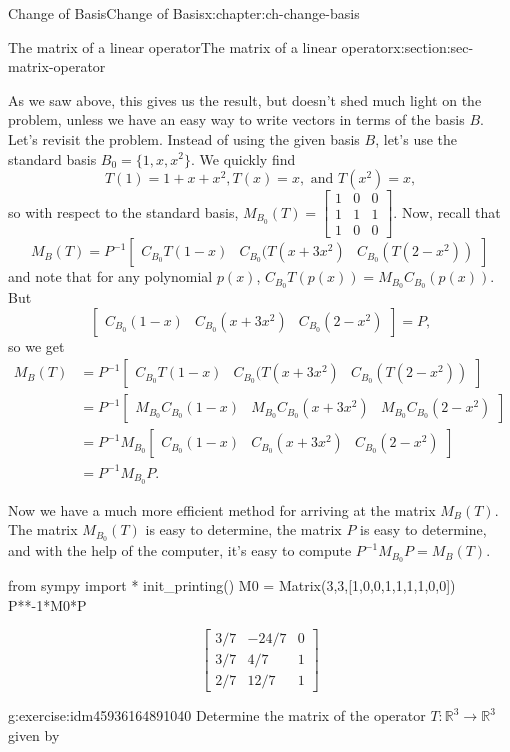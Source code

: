 \documentclass[oneside,10pt,]{book}
\numberwithin{equation}{section}
\newcommand{\bbm}{\begin{bmatrix}}
\newcommand{\ebm}{\end{bmatrix}}
\newcommand{\R}{\mathbb{R}}
\newcommand{\amp}{&}
\begin{document}
\begin{chapterptx}{Change of Basis}{}{Change of Basis}{}{}{x:chapter:ch-change-basis}
\begin{sectionptx}{The matrix of a linear operator}{}{The matrix of a linear operator}{}{}{x:section:sec-matrix-operator}
%
\par
As we saw above, this gives us the result, but doesn't shed much light on the problem, unless we have an easy way to write vectors in terms of the basis \(B\). Let's revisit the problem. Instead of using the given basis \(B\), let's use the standard basis \(B_0 = \{1,x,x^2\}\). We quickly find%
\begin{equation*}
T(1)=1+x+x^2, T(x) = x, \text{ and } T(x^2)=x\text{,}
\end{equation*}
so with respect to the standard basis, \(M_{B_0}(T) = \bbm 1\amp 0\amp 0\\1\amp 1\amp 1\\1\amp 0\amp 0\ebm\). Now, recall that%
\begin{equation*}
M_{B}(T)=P^{-1}\bbm C_{B_0}T(1-x)\amp C_{B_0}(T(x+3x^2)\amp C_{B_0}(T(2-x^2))\ebm
\end{equation*}
and note that for any polynomial \(p(x)\), \(C_{B_0}T(p(x)) = M_{B_0}C_{B_0}(p(x))\). But%
\begin{equation*}
\bbm C_{B_0}(1-x) \amp C_{B_0}(x+3x^2)\amp C_{B_0}(2-x^2)\ebm = P\text{,}
\end{equation*}
so we get%
\begin{align*}
M_B(T) \amp = P^{-1}\bbm C_{B_0}T(1-x)\amp C_{B_0}(T(x+3x^2)\amp C_{B_0}(T(2-x^2))\ebm\\
\amp = P^{-1}\bbm M_{B_0}C_{B_0}(1-x)\amp M_{B_0}C_{B_0}(x+3x^2)\amp M_{B_0}C_{B_0}(2-x^2)\ebm \\
\amp = P^{-1}M_{B_0}\bbm C_{B_0}(1-x) \amp C_{B_0}(x+3x^2)\amp C_{B_0}(2-x^2)\ebm\\
\amp = P^{-1}M_{B_0}P\text{.}
\end{align*}
%
\par
Now we have a much more efficient method for arriving at the matrix \(M_B(T)\). The matrix \(M_{B_0}(T)\) is easy to determine, the matrix \(P\) is easy to determine, and with the help of the computer, it's easy to compute \(P^{-1}M_{B_0}P = M_B(T)\).%
\begin{sageinput}
from sympy import *
init_printing()
M0 = Matrix(3,3,[1,0,0,1,1,1,1,0,0])
P**-1*M0*P
\end{sageinput}
\begin{sageoutput}
\[\bbm 3/7\amp -24/7\amp 0\\3/7\amp 4/7\amp 1\\2/7\amp 12/7\amp 1\ebm\]
\end{sageoutput}
\begin{inlineexercise}{}{g:exercise:idm45936164891040}%
Determine the matrix of the operator \(T:\R^3\to \R^3\) given by%

\end{inlineexercise}
\end{sectionptx}
\end{chapterptx}
\end{document}
